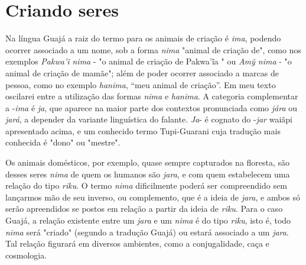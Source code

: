 \section{Criando seres}\label{criando-seres}

Na língua Guajá a raiz do termo para os animais de criação é \emph{ima},
podendo ocorrer associado a um nome, sob a forma \emph{nima} "animal de
criação de", como nos exemplos \emph{Pakwa'ĩ nima} - "o animal de
criação de Pakwa'ĩa " ou \emph{Amỹ nima} - "o animal de criação de
mamãe"; além de poder ocorrer associado a marcas de pessoa, como no
exemplo \emph{hanima}, ``meu animal de criação''. Em meu texto oscilarei
entre a utilização das formas \emph{nima} e \emph{hanima}. A categoria
complementar a -\emph{ima} é \emph{ja}, que aparece na maior parte dos
contextos pronunciada como \emph{jára} ou \emph{jará}, a depender da
variante linguística do falante. \emph{Ja}- é cognato do -\emph{jar}
waiãpi apresentado acima, e um conhecido termo Tupi-Guarani cuja
tradução mais conhecida é "dono" ou "mestre".

Os animais domésticos, por exemplo, quase sempre capturados na floresta,
são desses seres \emph{nima} de quem os humanos são \emph{jara}, e com
quem estabelecem uma relação do tipo \emph{riku}. O termo \emph{nima}
dificilmente poderá ser compreendido sem lançarmos mão de seu inverso,
ou complemento, que é a ideia de \emph{jara}, e ambos só serão
apreendidos se postos em relação a partir da ideia de \emph{riku}. Para
o caso Guajá, a relação existente entre um \emph{jara} e um \emph{nima}
é do tipo \emph{riku}, isto é, todo \emph{nima} será "criado" (segundo a
tradução Guajá) ou estará associado a um \emph{jara}. Tal relação
figurará em diversos ambientes, como a conjugalidade, caça e cosmologia.

